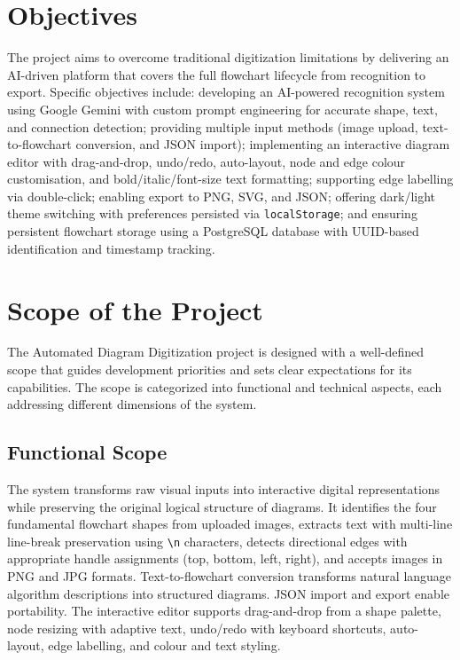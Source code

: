 \section{Objectives}
 
The project aims to overcome traditional digitization limitations by delivering an AI-driven platform that covers the full flowchart lifecycle from recognition to export. Specific objectives include: developing an AI-powered recognition system using Google Gemini with custom prompt engineering for accurate shape, text, and connection detection; providing multiple input methods (image upload, text-to-flowchart conversion, and JSON import); implementing an interactive diagram editor with drag-and-drop, undo/redo, auto-layout, node and edge colour customisation, and bold/italic/font-size text formatting; supporting edge labelling via double-click; enabling export to PNG, SVG, and JSON; offering dark/light theme switching with preferences persisted via \texttt{localStorage}; and ensuring persistent flowchart storage using a PostgreSQL database with UUID-based identification and timestamp tracking.
 
\section{Scope of the Project}
The Automated Diagram Digitization project is designed with a well-defined scope that guides development priorities and sets clear expectations for its capabilities. The scope is categorized into functional and technical aspects, each addressing different dimensions of the system.

\subsection{Functional Scope}
 
The system transforms raw visual inputs into interactive digital representations while preserving the original logical structure of diagrams. It identifies the four fundamental flowchart shapes from uploaded images, extracts text with multi-line line-break preservation using \texttt{\textbackslash n} characters, detects directional edges with appropriate handle assignments (top, bottom, left, right), and accepts images in PNG and JPG formats. Text-to-flowchart conversion transforms natural language algorithm descriptions into structured diagrams. JSON import and export enable portability. The interactive editor supports drag-and-drop from a shape palette, node resizing with adaptive text, undo/redo with keyboard shortcuts, auto-layout, edge labelling, and colour and text styling.
 
